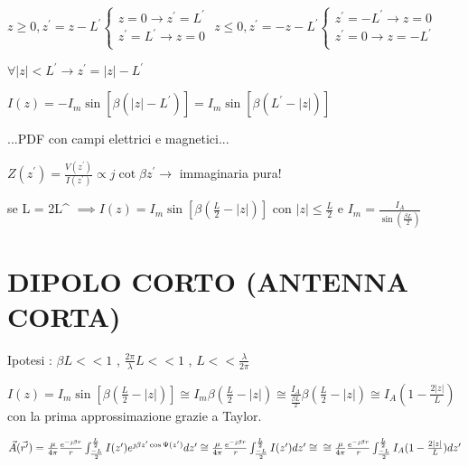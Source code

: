 $z \ge 0,  z^{\prime} = z-L^{\prime} \begin{cases} z = 0 \to z^{\prime} = L^{\prime}\\ z^{\prime} = L^{\prime} \to z = 0\\ \end{cases}$
\hfill
$z \le 0,  z^{\prime} = -z-L^{\prime} \begin{cases} z^{\prime} = -L^{\prime} \to z = 0\\ z^{\prime} = 0 \to z = -L^{\prime}\\ \end{cases}$

$\forall \left | z \right | < L^{\prime} \to  z^{\prime} = \left | z \right | - L^{\prime}$

$I(z) = - I_m \sin [\beta (\left | z \right | - L^{\prime})] = I_m \sin [\beta (L^{\prime} - \left | z \right |)]$

...PDF con campi elettrici e magnetici...

$Z(z^{\prime}) = \frac{V(z^{\prime})}{I(z^{\prime})} \propto j \cot \beta z^{\prime} \to$ immaginaria pura!

se L = 2L^{\prime} $\implies I(z) = I_m \sin [\beta (\frac{L}{2} - \left | z \right |)]$ con $\left | z \right | \le \frac{L}{2}$ e $I_m = \frac{I_A}{\sin (\frac{\beta L}{2})}$

\clearpage

\section{DIPOLO CORTO (ANTENNA CORTA)}
Ipotesi : $\beta L << 1$ , $\frac{2 \pi}{\lambda}L << 1$ , $L << \frac{\lambda}{2 \pi}$

$I(z) = I_m \sin [\beta (\frac{L}{2} - \left | z \right |)] \cong I_m \beta (\frac{L}{2} - \left | z \right |) \cong \frac{I_A}{\frac{\beta L}{2}} \beta (\frac{L}{2} - \left | z \right |) \cong I_A(1-\frac{2 \left | z \right |}{L}) $
con la prima approssimazione grazie a Taylor.

$\vec{A}(\vec{r^{\prime}}) = \frac{\mu}{4\pi} \frac{e^{-\jmath\beta r}}{r} \int_{\frac{-L}{2}}^{\frac{L}{2}} I(z^{\prime}) e^{\jmath\beta z^{\prime}\cos \Psi (z^{\prime})}dz^{\prime} \cong  \frac{\mu}{4\pi} \frac{e^{-\jmath\beta r}}{r} \int_{\frac{-L}{2}}^{\frac{L}{2}} I(z^{\prime})dz^{\prime} \cong \\ \cong \frac{\mu}{4\pi} \frac{e^{-\jmath\beta r}}{r} \int_{\frac{-L}{2}}^{\frac{L}{2}} I_A (1-\frac{2 \left | z \right |}{L}) dz^{\prime} $

